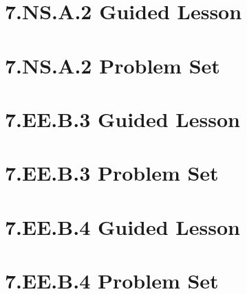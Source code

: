 \documentclass[a4paper,12pt]{article}
\begin{document}
\section{7.NS.A.2 Guided Lesson}


\newpage
\section{7.NS.A.2 Problem Set}


\newpage
\section{7.EE.B.3 Guided Lesson}


\newpage
\section{7.EE.B.3 Problem Set}


\newpage
\section{7.EE.B.4 Guided Lesson}


\newpage
\section{7.EE.B.4 Problem Set}

\end{document}
